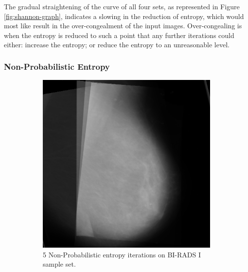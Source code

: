 The gradual straightening of the curve of all four sets, as represented in Figure \ref{fig:shannon-graph}, indicates a slowing in the reduction of entropy, which would most like result in the over-congealment of the input images. Over-congealing is when the entropy is reduced to such a point that any further iterations could either: increase the entropy; or reduce the entropy to an unreasonable level.

\newpage
\subsubsection{Non-Probabilistic Entropy}

\begin{figure}[H]
    \centering
    \begin{subfigure}[t]{0.3\textwidth}
        \includegraphics[width=\textwidth]{Chapter3/nonProb-img/nonProb-5.png}
        \caption{5 Non-Probabilistic entropy iterations on BI-RADS I sample set.}
        \label{fig:5-nonProb}
    \end{subfigure} \hfill
    ~ %
    \begin{subfigure}[t]{0.3\textwidth}

\end{subfigure}
\end{figure}
